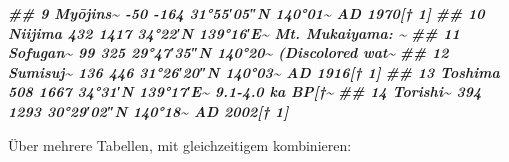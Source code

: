 \documentclass[
  ngerman,
]{article}
\newenvironment{Shaded}{\begin{snugshade}}{\end{snugshade}}
\newcommand{\DocumentationTok}[1]{\textcolor[rgb]{0.56,0.35,0.01}{\textbf{\textit{#1}}}}
\begin{document}
\begin{Shaded}
\begin{Highlighting}[]
\DocumentationTok{\#\#  9 Myōjins\textasciitilde{} {-}50             {-}164             31°55′05″N 140°01\textasciitilde{} AD 1970[† 1]    }
\DocumentationTok{\#\# 10 Niijima  432             1417             34°22′N 139°16′E﻿\textasciitilde{}  Mt. Mukaiyama: \textasciitilde{}}
\DocumentationTok{\#\# 11 Sofugan\textasciitilde{} 99              325              29°47′35″N 140°20\textasciitilde{} (Discolored wat\textasciitilde{}}
\DocumentationTok{\#\# 12 Sumisuj\textasciitilde{} 136             446              31°26′20″N 140°03\textasciitilde{} AD 1916[† 1]    }
\DocumentationTok{\#\# 13 Toshima  508             1667             34°31′N 139°17′E﻿\textasciitilde{}  9.1{-}4.0 ka BP[†\textasciitilde{}}
\DocumentationTok{\#\# 14 Torishi\textasciitilde{} 394             1293             30°29′02″N 140°18\textasciitilde{} AD 2002[† 1]}
\end{Highlighting}
\end{Shaded}

Über mehrere Tabellen, mit gleichzeitigem kombinieren:
\end{document}
